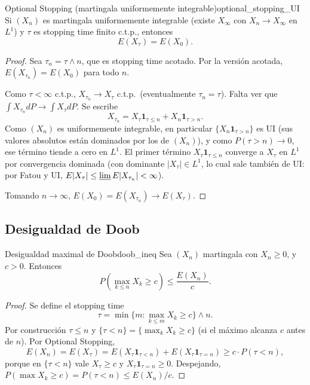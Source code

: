 \documentclass[11pt, a4paper]{article}
\begin{document}
\begin{teorema}{Optional Stopping (martingala uniformemente integrable)}{optional_stopping_UI}
Si $(X_n)$ es martingala uniformemente integrable (existe $X_\infty$ con $X_n \to X_\infty$ en
$L^1$) y $\tau$ es stopping time finito c.t.p., entonces
$$ E(X_\tau) = E(X_0). $$
\end{teorema}

\begin{proof}
Sea $\tau_n = \tau \wedge n$, que es stopping time acotado. Por la versión acotada,
$E(X_{\tau_n}) = E(X_0)$ para todo $n$.

Como $\tau < \infty$ c.t.p., $X_{\tau_n} \to X_\tau$ c.t.p.\ (eventualmente $\tau_n = \tau$). Falta
ver que $\int X_{\tau_n} dP \to \int X_\tau dP$. Se escribe
$$ X_{\tau_n} = X_\tau \mathbf{1}_{\tau \le n} + X_n \mathbf{1}_{\tau > n}. $$
Como $(X_n)$ es uniformemente integrable, en particular $\{X_n \mathbf{1}_{\tau > n}\}$ es UI (sus
valores absolutos están dominados por los de $(X_n)$), y como $P(\tau > n) \to 0$, ese término
tiende a cero en $L^1$. El primer término $X_\tau \mathbf{1}_{\tau \le n}$ converge a $X_\tau$ en
$L^1$ por convergencia dominada (con dominante $|X_\tau| \in L^1$, lo cual sale también de UI:
por Fatou y UI, $E|X_\tau| \le \varliminf E|X_{\tau_n}| < \infty$).

Tomando $n \to \infty$, $E(X_0) = E(X_{\tau_n}) \to E(X_\tau)$.
\end{proof}

\subsection{Desigualdad de Doob}

\begin{teorema}{Desigualdad maximal de Doob}{doob_ineq}
Sea $(X_n)$ martingala con $X_n \ge 0$, y $c > 0$. Entonces
$$ P\left(\max_{k \le n} X_k \ge c\right) \le \frac{E(X_n)}{c}. $$
\end{teorema}

\begin{proof}
Se define el stopping time
$$ \tau = \min\{m : \max_{k \le m} X_k \ge c\} \wedge n. $$
Por construcción $\tau \le n$ y $\{\tau < n\} = \{\max_k X_k \ge c\}$ (si el máximo alcanza $c$
antes de $n$). Por Optional Stopping,
$$ E(X_n) = E(X_\tau) = E(X_\tau \mathbf{1}_{\tau < n}) + E(X_\tau \mathbf{1}_{\tau = n})
\ge c \cdot P(\tau < n), $$
porque en $\{\tau < n\}$ vale $X_\tau \ge c$ y $X_\tau \mathbf{1}_{\tau = n} \ge 0$. Despejando,
$P(\max X_k \ge c) = P(\tau < n) \le E(X_n)/c$.
\end{proof}
\end{document}
